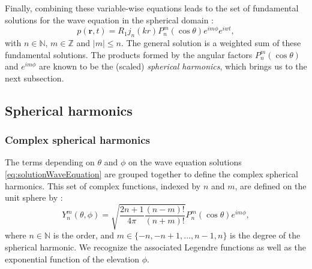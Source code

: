 Finally, combining these variable-wise equations leads to the set of fundamental solutions for the wave equation in the spherical domain :
\begin{equation}
\label{eq:solutionWaveEquation}
    p(\mathbf{r},t) = R_1 j_n(kr) P_n^m(\cos \theta) e^{im\phi} e^{iwt},
\end{equation}
with $n \in \mathbb{N}$, $m \in \mathbb{Z}$ and $\lvert m \rvert \leq n$. The general solution is a weighted sum of these fundamental solutions. The products formed by the angular factors $P_n^m(\cos \theta)$ and $e^{im\phi}$ are known to be the (scaled) \textit{spherical harmonics}, which brings us to the next subsection.

\subsection{Spherical harmonics}

\subsubsection{Complex spherical harmonics}

The terms depending on $\theta$ and $\phi$ on the wave equation solutions \eqref{eq:solutionWaveEquation} are grouped together to define the complex spherical harmonics. This set of complex functions, indexed by $n$ and $m$, are defined on the unit sphere by \cite[p.~4]{rafaely_fundamentals_2019}:
\begin{equation}
    Y_n^m(\theta,\phi) = \sqrt{\frac{2n+1}{4 \pi} \frac{(n-m)!}{(n+m)!}} P_n^m(\cos\theta) e^{i m \phi},
\end{equation}
where $n \in \mathbb{N}$ is the order, and $m \in \{-n, -n+1, ..., n-1, n\}$ is the degree of the spherical harmonic. We recognize the associated Legendre functions as well as the exponential function of the elevation $\phi$.

